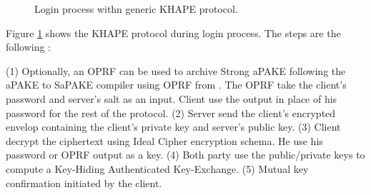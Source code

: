 \documentclass[../report.tex]{subfiles}
\begin{document}
\begin{figure}[h]
 \centering
 
 \setlength{\fboxsep}{10pt}
 \setlength{\fboxrule}{1pt}
 
 \caption{Login process withn generic KHAPE protocol.}
 \label{fig:Generic_KHAPE}
\end{figure}

Figure \ref{fig:Generic_KHAPE} shows the KHAPE protocol during login process.
The steps are the following :

(1) Optionally, an OPRF can be used to archive Strong aPAKE following the aPAKE to SaPAKE compiler using OPRF from \cite{OPAQUE_Paper}. The OPRF take the client's password and server's salt as an input. Client use the output in place of his password for the rest of the protocol.
(2) Server send the client's encrypted envelop containing the client's private key and server's public key.
(3) Client decrypt the ciphertext using Ideal Cipher encryption schema. He use his password or OPRF output as a key.
(4) Both party use the public/private keys to compute a Key-Hiding Authenticated Key-Exchange.
(5) Mutual key confirmation initiated by the client.

\paragraph{}
\end{document}
